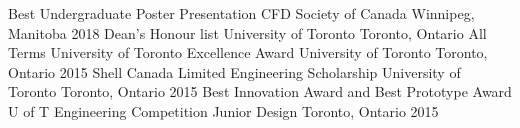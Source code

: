 \begin{cvhonors}
\cvhonor
    {Best Undergraduate Poster Presentation}
    {CFD Society of Canada}
    {Winnipeg, Manitoba}
    {2018}  
\cvhonor
    {Dean's Honour list}
    {University of Toronto}
    {Toronto, Ontario}
    {All Terms}  
\cvhonor
    {University of Toronto Excellence Award}
    {University of Toronto}
    {Toronto, Ontario}
    {2015}   
\cvhonor
    {Shell Canada Limited Engineering Scholarship}
    {University of Toronto}
    {Toronto, Ontario}
    {2015}      
\cvhonor
    {Best Innovation Award and Best Prototype Award}
    {U of T Engineering Competition Junior Design}
    {Toronto, Ontario}
    {2015}    
\end{cvhonors}